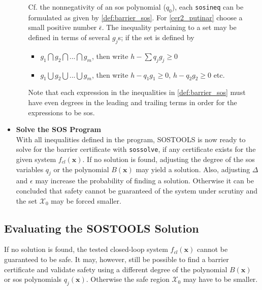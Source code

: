 \begin{itemize}
\begin{itemize}
		Cf. the nonnegativity of an \gls{sos} polynomial ($q_0$), each \texttt{sosineq} can be formulated as given by  \autoref{def:barrier_sos}. For \autoref{cer2_putinar} choose a small positive number $\bar{\epsilon}$. The inequality pertaining to a set may be defined in terms of several $g_j$s; if the set is defined by
		\begin{itemize}
			\item $g_1 \bigcap g_2 \bigcap ... \bigcap g_m$, then write $h - \sum q_jg_j\geq 0$
			\item $g_1 \bigcup g_2 \bigcup ... \bigcup g_m$, then write $h - q_1g_1\geq 0$, $h - q_2g_2\geq 0$ etc.
		\end{itemize} 
		Note that each expression in the inequalities in \autoref{def:barrier_sos} must have even degrees in the leading and trailing terms in order for the expressions to be \gls{sos}.
	\end{itemize}
	\item \textbf{Solve the SOS Program}\\
	With all inequalities defined in the program, SOSTOOLS is now ready to solve for the barrier certificate with \texttt{sossolve}, if any certificate exists for the given system $f_{cl}(\mathbf{x})$. If no solution is found, adjusting the degree of the \gls{sos} variables $q_j$ or the polynomial $B(\mathbf{x})$ may yield a solution. Also, adjusting $\Delta$ and $\epsilon$ may increase the probability of finding a solution. Otherwise it can be concluded that safety cannot be guaranteed of the system under scrutiny and the set $\mathcal{X}_0$ may be forced smaller. 
\end{itemize}









\subsection{Evaluating the SOSTOOLS Solution}\label{subsec:eval_sos}
If no solution is found, the tested closed-loop system $f_{cl}(\mathbf{x})$ cannot be guaranteed to be safe. It may, however, still be possible to find a barrier certificate and validate safety using a different degree of the polynomial $B(\mathbf{x})$ or \gls{sos} polynomials $q_j(\mathbf{x})$. Otherwise the safe region $\mathcal{X}_0$ may have to be smaller.

